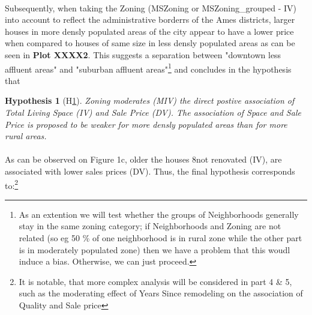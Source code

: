 \documentclass[a4paper]{article}
\newtheorem{hyp}{Hypothesis}
\begin{document}
\indent \paragraph{} Subsequently, when taking the Zoning (MSZoning or MSZoning\_grouped - IV) into account to reflect the administrative borderrs of the Ames districts, larger houses in more densly populated areas of the city appear to have a lower price when compared to houses of same size in less densly populated areas as can be seen in \textbf{Plot XXXX2}. This suggests a separation between "downtown less affluent areas" and "suburban affluent areas"\footnote{As an extention\: we will test whether the groups of Neighborhoods generally stay in the same zoning category; if Neighborhoods and Zoning are not related (so eg 50 \% of one neighborhood is in rural zone while the other part is in moderately populated zone) then we have a problem that this woudl induce a bias. Otherwise, we can just proceed.} and concludes in the hypothesis that

\begin{hyp}[H\ref{hyp:second}] \label{hyp:second}
Zoning moderates (MIV) the direct postive association of Total Living Space (IV) and Sale Price (DV). The association of Space and Sale Price is proposed to be weaker for more densly populated areas than for more rural areas. 
\end{hyp}

\begin{center}


\end{center}

\indent \paragraph{} As can be observed on Figure 1c, older the houses 8not renovated (IV), are associated with lower sales  prices (DV). Thus, the final hypothesis corresponds to:\footnote{It is notable, that more complex analysis will be considered in part 4 \& 5, such as the moderating effect of Years Since remodeling on the association of Quality and Sale price} 
\end{document}
